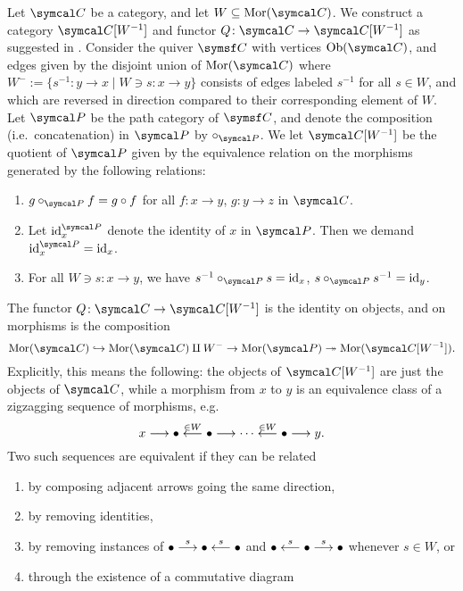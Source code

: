 \begin{construction}\label{construction:gabriel-zisman-localization}
	Let \(\calC\) be a category, and let \(W\subseteq\Mor(\calC)\). We construct a category \(\calC[W^{-1}]\) and functor \(Q\!:\calC\to\calC[W^{-1}]\) as suggested in \cite{krause-homological-theory-of-representations}.
	Consider the quiver \(\sfC\) with vertices \(\Ob(\calC)\), and edges given by the disjoint union of \(\Mor(\calC)\) where \(W^- := \{ s^{-1}\!: y\to x \mid W\ni s\!:x\to y \}\) consists
	of edges labeled \(s^{-1}\) for all \(s\in W\), and which are reversed in direction compared to their corresponding element of \(W\). Let \(\calP\) be the path category of \(\sfC\), and
	denote the composition (i.e.\ concatenation) in \(\calP\) by \(\circ_{\calP}\). We let \(\calC[W^{-1}]\) be the quotient of \(\calP\) given by the equivalence relation on the morphisms generated by
	the following relations:
	\begin{enumerate}[label=(\arabic*)]
	\item \(g\circ_{\calP} f = g\circ f\) for all \(f\!:x\to y\), \(g\!:y\to z\) in \(\calC\).
	\item Let \(\id^{\calP}_x\) denote the identity of \(x\) in \(\calP\). Then we demand \(\id^{\calP}_x = \id_x\).
	\item For all \(W\ni s\!:x\to y\), we have \(s^{-1}\circ_{\calP} s = \id_x\), \(s\circ_{\calP} s^{-1} = \id_y\).
	\end{enumerate}
	The functor \(Q\!:\calC\to\calC[W^{-1}]\) is the identity on objects, and on morphisms is the composition
	\[ \Mor(\calC)\inj \Mor(\calC)\amalg W^- \to \Mor(\calP) \sur \Mor(\calC[W^{-1}]). \]
	Explicitly, this means the following: the objects of \(\calC[W^{-1}]\) are just the objects of \(\calC\), while a morphism from \(x\) to \(y\) is an equivalence class of a zigzagging sequence of morphisms, e.g.
	\[ x \longrightarrow \bullet \overset{\in W}{\longleftarrow}\bullet\longrightarrow\cdots\overset{\in W}{\longleftarrow}\bullet\longrightarrow y. \]
	Two such sequences are equivalent if they can be related
	\begin{enumerate}[label=(\arabic*')]
	\item by composing adjacent arrows going the same direction,
	\item by removing identities,
	\item by removing instances of \(\bullet \overset{s}{\longrightarrow} \bullet \overset{s}{\longleftarrow} \bullet \) and \(\bullet \overset{s}{\longleftarrow} \bullet \overset{s}{\longrightarrow} \bullet \) whenever \(s\in W\), or
	\item through the existence of a commutative diagram

\end{enumerate}
\end{construction}

